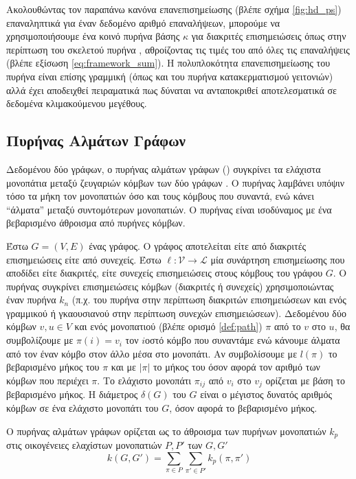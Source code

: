Ακολουθώντας τον παραπάνω κανόνα επανεπισημείωσης (βλέπε σχήμα \ref{fig:hd_ps}) επαναληπτικά για έναν δεδομένο αριθμό επαναλήψεων, μπορούμε να χρησιμοποιήσουμε ένα κοινό πυρήνα βάσης $\kappa$ για διακριτές επισημειώσεις όπως στην περίπτωση του σκελετού πυρήνα , αθροίζοντας τις τιμές του από όλες τις επαναλήψεις (βλέπε εξίσωση \ref{eq:framework_sum}).
Η πολυπλοκότητα επανεπισημείωσης του πυρήνα  είναι επίσης γραμμική (όπως και του πυρήνα κατακερματισμού γειτονιών) αλλά έχει αποδειχθεί πειραματικά πως δύναται να ανταποκριθεί αποτελεσματικά σε δεδομένα κλιμακούμενου μεγέθους.

\subsection{Πυρήνας Αλμάτων Γράφων}
\label{ssec:gh}
Δεδομένου δύο γράφων, ο πυρήνας αλμάτων γράφων () συγκρίνει τα ελάχιστα μονοπάτια μεταξύ ζευγαριών κόμβων των δύο γράφων \cite{feragen2013scalable}.
Ο πυρήνας λαμβάνει υπόψιν τόσο τα μήκη τον μονοπατιών όσο και τους κόμβους που συναντά, ενώ κάνει ``άλματα'' μεταξύ συντομότερων μονοπατιών.
Ο πυρήνας είναι ισοδύναμος με ένα βεβαρισμένο άθροισμα από πυρήνες κόμβων.\par
Έστω $G=(V,E)$ ένας γράφος.
Ο γράφος αποτελείται είτε από διακριτές επισημειώσεις είτε από συνεχείς.
Έστω $\ell : \mathcal{V} \rightarrow \mathcal{L}$ μία συνάρτηση επισημείωσης που αποδίδει είτε διακριτές, είτε συνεχείς επισημειώσεις στους κόμβους του γράφου $G$.
Ο πυρήνας συγκρίνει επισημειώσεις κόμβων (διακριτές ή συνεχείς) χρησιμοποιώντας έναν πυρήνα $k_n$ (π.χ. του πυρήνα  στην περίπτωση διακριτών επισημειώσεων και ενός γραμμικού ή γκαουσιανού στην περίπτωση συνεχών επισημειώσεων).
Δεδομένου δύο κόμβων $v,u \in V$ και ενός μονοπατιού (βλέπε ορισμό \ref{def:path}) $\pi$ από το $v$ στο $u$, θα συμβολίζουμε με $\pi(i) = v_i$ τον $i$οστό κόμβο που συναντάμε ενώ κάνουμε άλματα από τον έναν κόμβο στον άλλο μέσα στο μονοπάτι.
Αν συμβολίσουμε με $l(\pi)$ το βεβαρισμένο μήκος του $\pi$ και με $|\pi|$ το μήκος του όσον αφορά τον αριθμό των κόμβων που περιέχει $\pi$.
Το ελάχιστο μονοπάτι $\pi_{ij}$ από $v_i$ στο $v_j$ ορίζεται με βάση το βεβαρισμένο μήκος.
Η διάμετρος $\delta(G)$ του $G$ είναι ο μέγιστος δυνατός αριθμός κόμβων σε ένα ελάχιστο μονοπάτι του $G$, όσον αφορά το βεβαρισμένο μήκος.\par
Ο πυρήνας αλμάτων γράφων ορίζεται ως το άθροισμα των πυρήνων μονοπατιών $k_p$ στις οικογένειες ελαχίστων μονοπατιών $P, P'$ των $G,G'$
\begin{equation}
    k(G,G') = \sum_{\pi \in P} \sum_{\pi' \in P'} k_p(\pi, \pi')
\end{equation}
